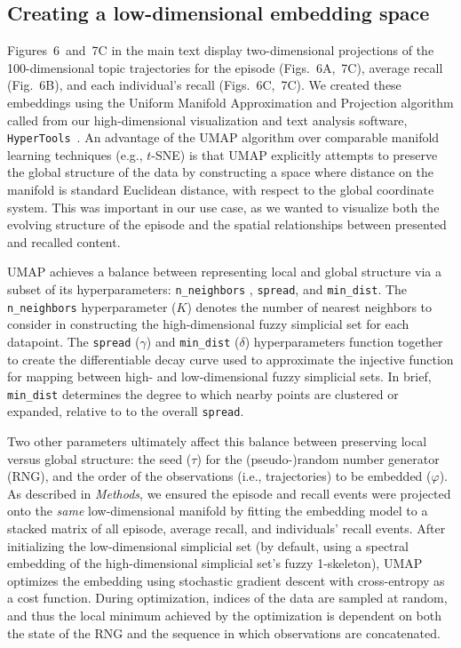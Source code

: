 \documentclass{article}
\newcommand{\trajectories}{6}
\newcommand{\wordles}{7}
\begin{document}
\subsection*{Creating a low-dimensional embedding space}
Figures~\trajectories~and~\wordles C in the main text display two-dimensional projections of the 100-dimensional topic trajectories for the episode (Figs.~\trajectories A,~\wordles C), average recall (Fig.~\trajectories B), and each individual's recall (Figs.~\trajectories C,~\wordles C).  We created these embeddings using the Uniform Manifold Approximation and Projection algorithm \citep[UMAP;][]{McInEtal18} called from our high-dimensional visualization and text analysis software, \texttt{HyperTools}~\citep{HeusEtal18a}.  An advantage of the UMAP algorithm over comparable manifold learning techniques (e.g., $t$-SNE) is that UMAP explicitly attempts to preserve the global structure of the data \citep{McInEtal18,BechEtal19} by constructing a space where distance on the manifold is standard Euclidean distance, with respect to the global coordinate system.  This was important in our use case, as we wanted to visualize both the evolving structure of the episode and the spatial relationships between presented and recalled content.

UMAP achieves a balance between representing local and global structure via a subset of its hyperparameters: \texttt{n\_neighbors} , \texttt{spread}, and \texttt{min\_dist}.  The \texttt{n\_neighbors} hyperparameter ($K$) denotes the number of nearest neighbors to consider in constructing the high-dimensional fuzzy simplicial set for each datapoint.  The \texttt{spread} ($\gamma$) and \texttt{min\_dist} ($\delta$) hyperparameters function together to create the differentiable decay curve used to approximate the injective function for mapping between high- and low-dimensional fuzzy simplicial sets.  In brief, \texttt{min\_dist} determines the degree to which nearby points are clustered or expanded, relative to to the overall \texttt{spread}.

Two other parameters ultimately affect this balance between preserving local versus global structure: the seed ($\tau$) for the (pseudo-)random number generator (RNG), and the order of the observations (i.e., trajectories) to be embedded ($\varphi$).  As described in \textit{Methods}, we ensured the episode and recall events were projected onto the \textit{same} low-dimensional manifold by fitting the embedding model to a stacked matrix of all episode, average recall, and individuals' recall events.  After initializing the low-dimensional simplicial set (by default, using a spectral embedding of the high-dimensional simplicial set's fuzzy 1-skeleton), UMAP optimizes the embedding using stochastic gradient descent with cross-entropy as a cost function.  During optimization, indices of the data are sampled at random, and thus the local minimum achieved by the optimization is dependent on both the state of the RNG and the sequence in which observations are concatenated.
\end{document}
